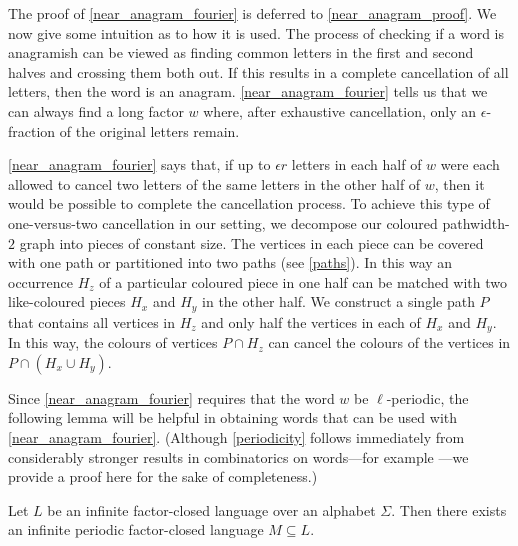 \documentclass{patmorin}
\begin{document}
The proof of \cref{near_anagram_fourier} is deferred to \cref{near_anagram_proof}.  We now give some intuition as to how it is used.  The process of checking if a word is anagramish can be viewed as finding common letters in the first and second halves and crossing them both out.  If this results in a complete cancellation of all letters, then the word is an anagram.  \cref{near_anagram_fourier} tells us that we can always find a long factor $w$ where, after exhaustive cancellation, only an $\epsilon$-fraction of the original letters remain.

\cref{near_anagram_fourier} says that, if up to $\epsilon r$ letters in each half of $w$ were each allowed to cancel two letters of the same letters in the other half of $w$, then it would be possible to complete the cancellation process.  To achieve this type of one-versus-two cancellation in our setting, we decompose our coloured pathwidth-$2$ graph into pieces of constant size.  The vertices in each piece can be covered with one path or partitioned into two paths (see \cref{paths}).  In this way an occurrence $H_z$ of a particular coloured piece in one half can be matched with two like-coloured pieces $H_x$ and $H_y$ in the other half. We construct a single path $P$ that contains all vertices in $H_z$ and only half the vertices in each of $H_x$ and $H_y$.  In this way, the colours of vertices $P\cap H_z$ can cancel the colours of the vertices in $P\cap(H_x\cup H_y)$.

Since \cref{near_anagram_fourier} requires that the word $w$ be $\ell$-periodic, the following lemma will be helpful in obtaining words that can be used with \cref{near_anagram_fourier}. (Although \cref{periodicity} follows immediately from considerably stronger results in combinatorics on words---for example \citet[Proposition~1.5.12]{lothaire:algebraic}---we provide a proof here for the sake of completeness.)


\begin{lem}\label{periodicity}
    Let $L$ be an infinite factor-closed language over an alphabet $\Sigma$.  Then there exists an infinite periodic factor-closed language $M\subseteq L$.
\end{lem}
\end{document}
